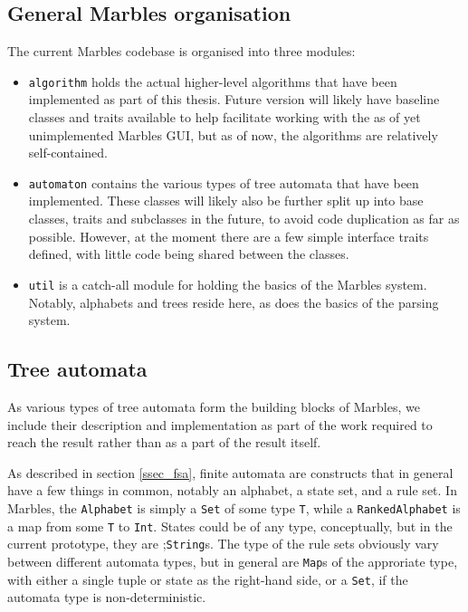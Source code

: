 \subsection{General Marbles organisation}

The current Marbles codebase is organised into three modules:
\begin{itemize}
\item \texttt{algorithm} holds the actual higher-level algorithms that have
been implemented as part of this thesis. Future version will likely have
baseline classes and traits available to help facilitate working with the
as of yet unimplemented Marbles GUI, but as of now, the algorithms are
relatively self-contained.
\item \texttt{automaton} contains the various types of tree automata that
have been implemented. These classes will likely also be further split up
into base classes, traits and subclasses in the future, to avoid code
duplication as far as possible. However, at the moment there are a few
simple interface traits defined, with little code being shared between the
classes.  
\item \texttt{util} is a catch-all module for holding the basics of the
Marbles system. Notably, alphabets and trees reside here, as does the
basics of the parsing system.
\end{itemize}

\subsection{Tree automata}

As various types of tree automata form the building blocks of Marbles, we
include their description and implementation as part of the work required
to reach the result rather than as a part of the result itself.

As described in section \ref{ssec_fsa}, finite automata are constructs that
in general have a few things in common, notably an alphabet, a state set,
and a rule set. In Marbles, the \texttt{Alphabet} is simply a \texttt{Set}
of some type \texttt{T}, while a \texttt{RankedAlphabet} is a map from some 
\texttt{T} to \texttt{Int}. States could be of any type, conceptually, but
in the current prototype, they are ;\texttt{String}s. The type of the rule
sets obviously vary between different automata types, but in general are
\texttt{Map}s of the approriate type, with either a single tuple or state
as the right-hand side, or a \texttt{Set}, if the automata type is
non-deterministic.

